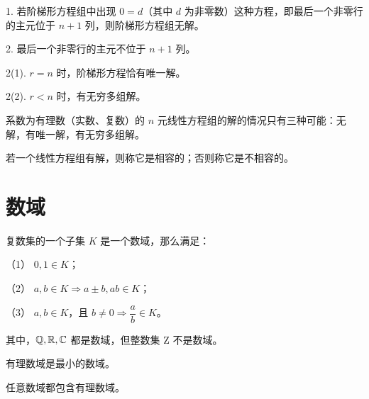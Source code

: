 1. 若阶梯形方程组中出现 $0=d$（其中 $d$ 为非零数）这种方程，即最后一个非零行的主元位于 $n+1$ 列，则阶梯形方程组无解。

2. 最后一个非零行的主元不位于 $n+1$ 列。

2(1). $r=n$ 时，阶梯形方程恰有唯一解。

2(2). $r<n$ 时，有无穷多组解。

\begin{theorem}
	系数为有理数（实数、复数）的 $n$ 元线性方程组的解的情况只有三种可能：无解，有唯一解，有无穷多组解。
\end{theorem}

若一个线性方程组有解，则称它是相容的；否则称它是不相容的。

\section{数域}

\begin{definition}
	复数集的一个子集 $K$ 是一个数域，那么满足：
	
	（1） $0,1\in K$；
	
	（2） $a,b\in K \Rightarrow a \pm b,ab\in K$；
	
	（3） $a,b \in K$，且 $b\ne 0 \Rightarrow \dfrac{a}{b}\in K$。
\end{definition}

其中，$\mathbb{Q},\mathbb{R},\mathbb{C}$ 都是数域，但整数集 $\mathrm{Z}$ 不是数域。

有理数域是最小的数域。

\begin{theorem}
	任意数域都包含有理数域。
\end{theorem}


